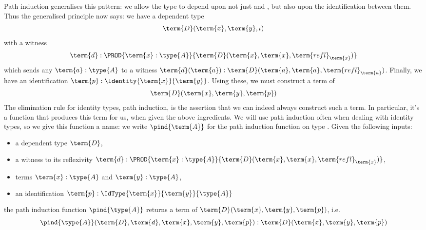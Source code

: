 Path induction generalises this pattern: we allow the type  to depend upon not just  and , but also upon the identification between them.  Thus the generalised principle now says:
we have a dependent type
\[
\term{D}(\term{x},\term{y},\iota)
\]
with a witness
\[
\term{d}:
\PROD{\term{x}:\type{A}}
{\term{D}(\term{x},\term{x},\term{refl}_{\term{x}})}
\] 
which sends any 
$\term{a}:\type{A}$
to
a witness $\term{d}(\term{a}): 
{\term{D}(\term{a},\term{a},\term{refl}_{\term{a}})}$.
Finally, we have an identification 
$\term{p}:
\Identity{\term{x}}{\term{y}}$.
Using these, we must construct a term of
\[
\term{D}(\term{x},\term{y},\term{p})
\]
The elimination rule for identity types, path induction, is the assertion that we can indeed always construct such a term.  In particular, it's a function that produces this term for us, when given the above ingredients.  We will use path induction often when dealing with identity types, so we give this function a name: we write $\pind{\term{A}}$ for the path induction function on type .  Given the following inputs:
\begin{itemize}
\item a dependent type $\term{D}$, 
\item a witness to its reflexivity $\term{d}:\PROD{\term{x}:\type{A}}
{\term{D}(\term{x},\term{x},\term{refl}_{\term{x}})}$, 
\item terms $\term{x}:\type{A}$ and $\term{y}:\type{A}$, 
\item an identification $\term{p}: \IdType{\term{x}}{\term{y}}{\type{A}}$
\end{itemize}
the path induction function $\pind{\type{A}}$ returns a term of 
$\term{D}(\term{x},\term{y},\term{p})$, i.e.
\[
\pind{\type{A}}(
\term{D},
\term{d},
\term{x}, \term{y}, \term{p}): \term{D}(\term{x},\term{y},\term{p})
\]




%















